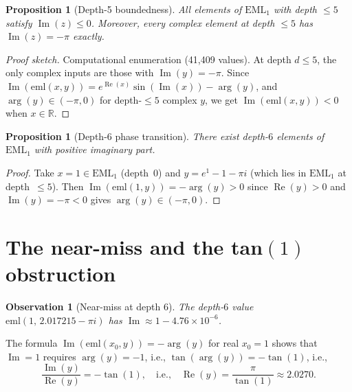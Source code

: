 \documentclass[12pt]{article}
\newtheorem{proposition}[theorem]{Proposition}
\newtheorem{observation}[theorem]{Observation}
\begin{document}
\begin{proposition}[Depth-5 boundedness]\label{prop:d5}
All elements of $\mathrm{EML}_1$ with depth $\leq 5$ satisfy
$\operatorname{Im}(z) \leq 0$.
Moreover, every complex element at depth $\leq 5$ has
$\operatorname{Im}(z) = -\pi$ exactly.
\end{proposition}
\begin{proof}[Proof sketch]
Computational enumeration (41{,}409 values). At depth $d \leq 5$, the only
complex inputs are those with $\operatorname{Im}(y) = -\pi$. Since
$\operatorname{Im}(\mathrm{eml}(x,y)) = e^{\operatorname{Re}(x)}\sin(\operatorname{Im}(x))
- \operatorname{arg}(y)$, and $\operatorname{arg}(y) \in (-\pi, 0)$ for
depth-$\leq 5$ complex $y$, we get $\operatorname{Im}(\mathrm{eml}(x,y)) < 0$
when $x \in \mathbb{R}$.
\end{proof}

\begin{proposition}[Depth-6 phase transition]\label{prop:d6}
There exist depth-$6$ elements of $\mathrm{EML}_1$ with positive imaginary part.
\end{proposition}
\begin{proof}
Take $x = 1 \in \mathrm{EML}_1$ (depth~$0$) and $y = e^1 - 1 - \pi i$
(which lies in $\mathrm{EML}_1$ at depth~$\leq 5$).
Then $\operatorname{Im}(\mathrm{eml}(1,y)) = -\operatorname{arg}(y) > 0$
since $\operatorname{Re}(y) > 0$ and $\operatorname{Im}(y) = -\pi < 0$
gives $\operatorname{arg}(y) \in (-\pi, 0)$.
\end{proof}

\section{The near-miss and the tan\texorpdfstring{$(1)$}{(1)} obstruction}

\begin{observation}[Near-miss at depth 6]\label{obs:nearmiss}
The depth-$6$ value $\mathrm{eml}(1,\, 2.017215 - \pi i)$ has
$\operatorname{Im} \approx 1 - 4.76 \times 10^{-6}$.
\end{observation}

The formula $\operatorname{Im}(\mathrm{eml}(x_0, y)) = -\operatorname{arg}(y)$
for real $x_0 = 1$ shows that $\operatorname{Im} = 1$ requires $\operatorname{arg}(y) = -1$,
i.e., $\tan(\operatorname{arg}(y)) = -\tan(1)$, i.e.,
\[
    \frac{\operatorname{Im}(y)}{\operatorname{Re}(y)} = -\tan(1),
    \quad \text{i.e.,} \quad
    \operatorname{Re}(y) = \frac{\pi}{\tan(1)} \approx 2.0270.
\]
\end{document}
